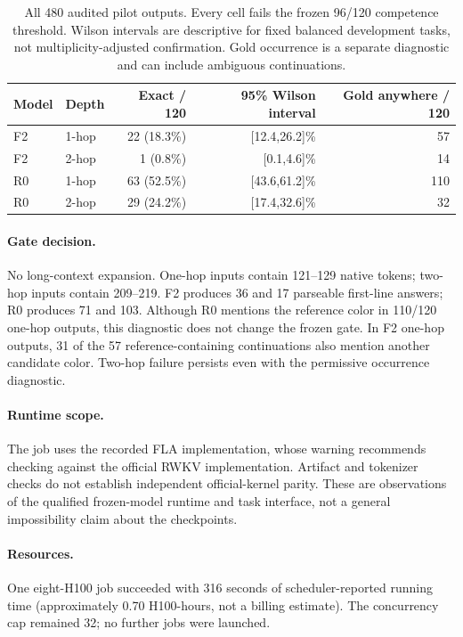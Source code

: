 \begin{table}[ht]\centering\small
\begin{tabular}{llrrr}\toprule
Model & Depth & Exact / 120 & 95\% Wilson interval & Gold anywhere / 120\\\midrule
F2 & 1-hop & 22 (18.3\%) & [12.4,26.2]\% & 57\\
F2 & 2-hop & 1 (0.8\%) & [0.1,4.6]\% & 14\\
R0 & 1-hop & 63 (52.5\%) & [43.6,61.2]\% & 110\\
R0 & 2-hop & 29 (24.2\%) & [17.4,32.6]\% & 32\\
\bottomrule\end{tabular}
\caption{All 480 audited pilot outputs. Every cell fails the frozen 96/120 competence threshold. Wilson intervals are descriptive for fixed balanced development tasks, not multiplicity-adjusted confirmation. Gold occurrence is a separate diagnostic and can include ambiguous continuations.}
\end{table}
\paragraph{Gate decision.} No long-context expansion. One-hop inputs contain 121--129 native tokens; two-hop inputs contain 209--219. F2 produces 36 and 17 parseable first-line answers; R0 produces 71 and 103. Although R0 mentions the reference color in 110/120 one-hop outputs, this diagnostic does not change the frozen gate. In F2 one-hop outputs, 31 of the 57 reference-containing continuations also mention another candidate color. Two-hop failure persists even with the permissive occurrence diagnostic.
\paragraph{Runtime scope.} The job uses the recorded FLA implementation, whose warning recommends checking against the official RWKV implementation. Artifact and tokenizer checks do not establish independent official-kernel parity. These are observations of the qualified frozen-model runtime and task interface, not a general impossibility claim about the checkpoints.
\paragraph{Resources.} One eight-H100 job succeeded with 316 seconds of scheduler-reported running time (approximately 0.70 H100-hours, not a billing estimate). The concurrency cap remained 32; no further jobs were launched.
